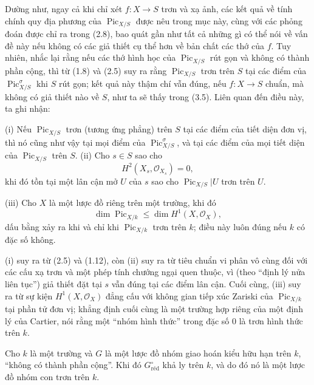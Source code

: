 Dường như, ngay cả khi chỉ xét $f:X\longrightarrow S$ trơn và xạ ảnh, các kết
quả về tính chính quy địa phương của $\operatorname{Pic}_{X/S}$ được nêu trong
mục này, cùng với các phỏng đoán được chỉ ra trong (2.8), bao quát gần như tất
cả những gì có thể nói về vấn đề này nếu không có các giả thiết cụ thể hơn về bản chất
các thớ của $f$. Tuy nhiên, nhắc lại rằng nếu các thớ hình học của
$\operatorname{Pic}_{X/S}$ rút gọn và không có thành phần cộng, thì từ (1.8)
và (2.5) suy ra rằng $\operatorname{Pic}_{X/S}$ trơn trên $S$ tại các điểm của
$\operatorname{Pic}_{X/S}^\sigma$ khi $S$ rút gọn; kết quả này thậm chí vẫn
đúng, nếu $f:X\longrightarrow S$ chuẩn, mà không có giả thiết nào về $S$, như
ta sẽ thấy trong (3.5). Liên quan đến điều này, ta ghi nhận:


\noindent(i) Nếu $\operatorname{Pic}_{X/S}$ trơn (tương ứng phẳng) trên $S$
tại các điểm của tiết diện đơn vị, thì nó cũng như vậy tại mọi điểm của
$\operatorname{Pic}_{X/S}^\sigma$, và tại các điểm của mọi tiết diện của
$\operatorname{Pic}_{X/S}$ trên $S$.
\noindent(ii) Cho $s\in S$ sao cho
\[
H^2(X_s,\mathcal O_{X_s})=0,
\]
khi đó tồn tại một lân cận mở $U$ của $s$ sao cho
$\operatorname{Pic}_{X/S}|U$ trơn trên $U$.

\noindent(iii) Cho $X$ là một lược đồ riêng trên một trường, khi đó
\[
\dim\operatorname{Pic}_{X/k}\leq\dim H^1(X,\mathcal O_X),
\]
dấu bằng xảy ra khi và chỉ khi $\operatorname{Pic}_{X/k}$ trơn trên $k$; điều
này luôn đúng nếu $k$ có đặc số không.

(i) suy ra từ (2.5) và (1.12), còn (ii) suy ra từ tiêu chuẩn vi phân vô cùng
đối với các cấu xạ trơn và một phép tính chướng ngại quen thuộc, vì (theo
``định lý nửa liên tục'') giả thiết đặt tại $s$ vẫn đúng tại các điểm lân cận.
Cuối cùng, (iii) suy ra từ sự kiện $H^1(X,\mathcal O_X)$ đẳng cấu với không
gian tiếp xúc Zariski của $\operatorname{Pic}_{X/k}$ tại phần tử đơn vị; khẳng
định cuối cùng là một trường hợp riêng của một định lý của Cartier, nói rằng
một ``nhóm hình thức'' trong đặc số 0 là trơn hình thức trên $k$.


 Cho $k$ là một trường và $G$ là một lược đồ nhóm giao
hoán kiểu hữu hạn trên $k$, ``không có thành phần cộng''. Khi đó
$G_{\mathrm{réd}}^\circ$ khả ly trên $k$, và do đó nó là một lược đồ nhóm con
trơn trên $k$.

